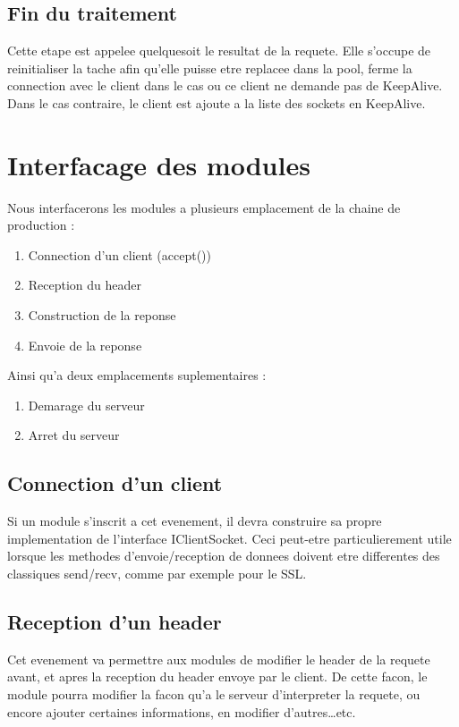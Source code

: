 \subsection {Fin du traitement}
Cette etape est appelee quelquesoit le resultat de la requete. Elle s'occupe de reinitialiser la tache afin qu'elle puisse etre replacee dans la pool, ferme la connection avec le client dans le cas ou ce client ne demande pas de KeepAlive. Dans le cas contraire, le client est ajoute a la liste des sockets en KeepAlive.
\newpage
\section {Interfacage des modules}
Nous interfacerons les modules a plusieurs emplacement de la chaine de production :
\begin{enumerate}
    \item Connection d'un client (accept())
    \item Reception du header
    \item Construction de la reponse
    \item Envoie de la reponse
\end{enumerate}

Ainsi qu'a deux emplacements suplementaires :
\begin{enumerate}
    \item Demarage du serveur
    \item Arret du serveur
\end{enumerate}

\subsection {Connection d'un client}
Si un module s'inscrit a cet evenement, il devra construire sa propre implementation de l'interface IClientSocket.
Ceci peut-etre particulierement utile lorsque les methodes d'envoie/reception de donnees doivent etre differentes des classiques send/recv, comme par exemple pour le SSL.

\subsection {Reception d'un header}
Cet evenement va permettre aux modules de modifier le header de la requete avant, et apres la reception du header envoye par le client.
De cette facon, le module pourra modifier la facon qu'a le serveur d'interpreter la requete, ou encore ajouter certaines informations, en modifier d'autres\ldots etc.

